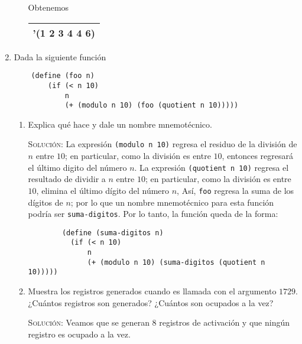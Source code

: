 \documentclass[letterpaper,11pt]{article}
\begin{document}
\begin{enumerate}
\begin{enumerate}
        Obtenemos 
        \begin{center}
            \begin{tabular}[h]{|c|}
                \hline
                '(1 2 3 4 4 6) \\
                \hline
            \end{tabular}
        \end{center}
    \end{enumerate}

    \item Dada la siguiente función 
    \begin{verbatim}
    (define (foo n)
        (if (< n 10)
            n
            (+ (modulo n 10) (foo (quotient n 10)))))
    \end{verbatim}

    \begin{enumerate}
        \item Explica qué hace y dale un nombre mnemotécnico.
        
        \textsc{Solución:} La expresión \texttt{(modulo n 10)} regresa el 
        residuo de la división de $n$ entre $10$; en particular, como la 
        división es entre $10$, entonces regresará el último digito del 
        número $n$. La expresión \texttt{(quotient n 10)} regresa el resultado
        de dividir a $n$ entre $10$; en particular, como la división es entre 
        $10$, elimina el último dígito del número $n$, Así, \texttt{foo} regresa 
        la suma de los dígitos de $n$; por lo que un nombre mnemotécnico para 
        esta función podría ser \texttt{suma-digitos}. Por lo tanto, la función 
        queda de la forma:
        \begin{verbatim}
        (define (suma-digitos n)
          (if (< n 10)
              n
              (+ (modulo n 10) (suma-digitos (quotient n 10)))))
        \end{verbatim}

        \item Muestra los registros generados cuando es llamada con el 
        argumento $1729$. ¿Cuántos registros son generados? ¿Cuántos son 
        ocupados a la vez?

        \textsc{Solución:} Veamos que se generan $8$ registros de activación 
        y que ningún registro es ocupado a la vez.


\end{enumerate}
\end{enumerate}
\end{document}
